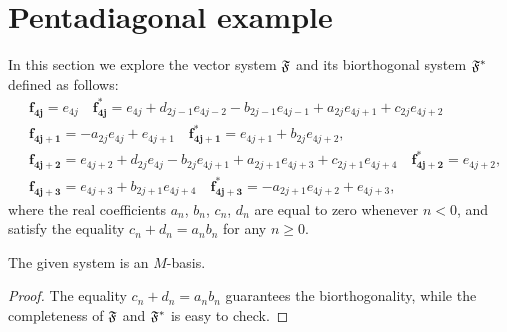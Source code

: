 \section{Pentadiagonal example}
  \label{section:pentadiagonal}
  In this section we explore the vector system $\mathfrak{F}$ and its biorthogonal system $\mathfrak{F^{*}}$ defined as follows:
  \begin{equation}
    \label{main-system}
    \begin{aligned}
      &\mathbf{f_{4j}} = e_{4j} \quad
      \mathbf{f^*_{4j}} = e_{4j} + d_{2j - 1} e_{4j-2} - b_{2j-1} e_{4j-1} + a_{2j} e_{4j+1} + c_{2j} e_{4j+2}\\
      &\mathbf{f_{4j+1}} = -a_{2j} e_{4j} + e_{4j+1} \quad
      \mathbf{f^*_{4j+1}} = e_{4j+1} + b_{2j} e_{4j+2},\\
      &\mathbf{f_{4j+2}} = e_{4j+2} + d_{2j} e_{4j} - b_{2j} e_{4j+1} + a_{2j+1} e_{4j+3} + c_{2j+1} e_{4j+4}\quad
      \mathbf{f^*_{4j+2}} = e_{4j+2},\\
      &\mathbf{f_{4j+3}} = e_{4j+3} + b_{2j+1} e_{4j+4}\quad
      \mathbf{f^*_{4j+3}} = -a_{2j+1} e_{4j+2} + e_{4j+3},
    \end{aligned}
  \end{equation}
    where the real coefficients $a_n$, $b_n$, $c_n$, $d_n$ are equal to zero whenever $n < 0$, and satisfy the equality
      $c_n + d_n = a_n b_n$ for any $n \geq 0$.
  \begin{prop}
    The given system is an $M$-basis.
  \end{prop}
  \begin{proof}
    The equality $c_n + d_n = a_n b_n$ guarantees the bi\-orthogonality,
      while the completeness of $\mathfrak{F}$ and $\mathfrak{F^{*}}$ is easy to check.
  \end{proof}


